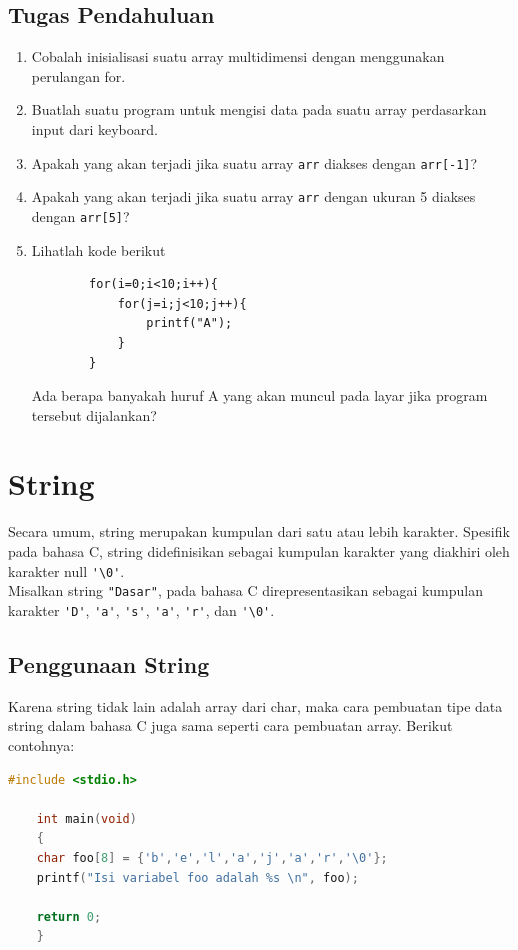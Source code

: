 \subsection{Tugas Pendahuluan}
\begin{enumerate}
    \item Cobalah inisialisasi suatu array multidimensi dengan menggunakan perulangan for.
    \item Buatlah suatu program untuk mengisi data pada suatu array perdasarkan input dari keyboard.
    \item Apakah yang akan terjadi jika suatu array \verb|arr| diakses dengan \verb|arr[-1]|?
    \item Apakah yang akan terjadi jika suatu array \verb|arr| dengan ukuran 5 diakses dengan \verb|arr[5]|?
    \item Lihatlah kode berikut
    \begin{verbatim}
        for(i=0;i<10;i++){
            for(j=i;j<10;j++){
                printf("A");
            }
        }
    \end{verbatim}
    Ada berapa banyakah huruf A yang akan muncul pada layar jika program tersebut dijalankan?
\end{enumerate}

\section{String}
Secara umum, string merupakan kumpulan dari satu atau lebih karakter. Spesifik pada bahasa C, string didefinisikan sebagai kumpulan karakter yang diakhiri oleh karakter null \verb|'\0'|.
\\
Misalkan string  \verb|"Dasar"|, pada bahasa C direpresentasikan sebagai kumpulan karakter \verb|'D'|, \verb|'a'|, \verb|'s'|, \verb|'a'|, \verb|'r'|, dan \verb|'\0'|.

\subsection{Penggunaan String}
Karena string tidak lain adalah array dari char, maka cara pembuatan tipe data string dalam bahasa C juga sama seperti cara pembuatan array. Berikut contohnya:
\begin{lstlisting}[language=c,caption = Contoh String dari Char,label=lst:array1d01]
	#include <stdio.h>
 
	int main(void)
	{
	char foo[8] = {'b','e','l','a','j','a','r','\0'};
	printf("Isi variabel foo adalah %s \n", foo);
	
	return 0;
	}
\end{lstlisting}

